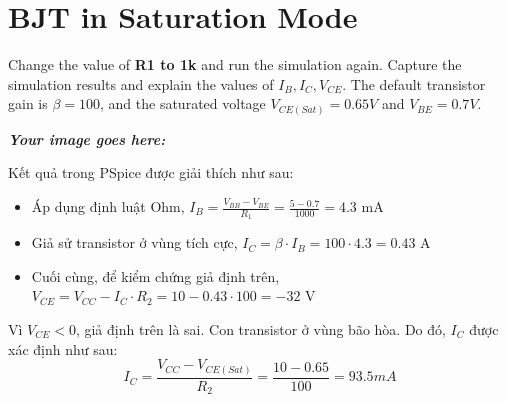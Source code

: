 \section{BJT in Saturation Mode}
Change the value of \textbf{R1 to 1k} and run the simulation again. Capture the simulation results and explain the values of $I_B, I_C, V_{CE}$. The default transistor gain is $\beta = 100$, and the saturated voltage $V_{CE(Sat)} = 0.65V$ and $V_{BE} = 0.7V$.

\textbf{\textit{Your image goes here:}}\\
\vspace{6cm}

Kết quả trong PSpice được giải thích như sau:

\begin{itemize}
    \item Áp dụng định luật Ohm, $I_B = \frac{V_{BB} - V_{BE}}{R_1} = \frac{5 - 0.7}{1000} =  4.3$ mA
    \item Giả sử transistor ở vùng tích cực, $I_C = \beta \cdot I_B = 100  \cdot 4.3 = 0. 43$ A  
    \item Cuối cùng, để kiểm chứng giả định trên, $V_{CE} = V_{CC} - I_C \cdot R_2 = 10 - 0.43 \cdot 100 = -32$ V 
\end{itemize}

Vì $V_{CE} < 0$, giả định trên là sai. Con transistor ở vùng bão hòa. Do đó, $I_C$ được xác định như sau:\\

$$I_C = \frac{V_{CC} - V_{CE(Sat)}}{R_2} = \frac{10 - 0.65}{100} = 93.5 mA$$

